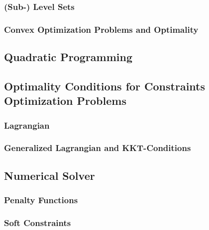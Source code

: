             \subsubsection{(Sub-) Level Sets} %

            \subsubsection{Convex Optimization Problems and Optimality} %

        \subsection{Quadratic Programming} %

        \subsection{Optimality Conditions for Constraints Optimization Problems} %

            \subsubsection{Lagrangian} %

            \subsubsection{Generalized Lagrangian and KKT-Conditions} %

        \subsection{Numerical Solver} %

            \subsubsection{Penalty Functions} %

            \subsubsection{Soft Constraints} %

